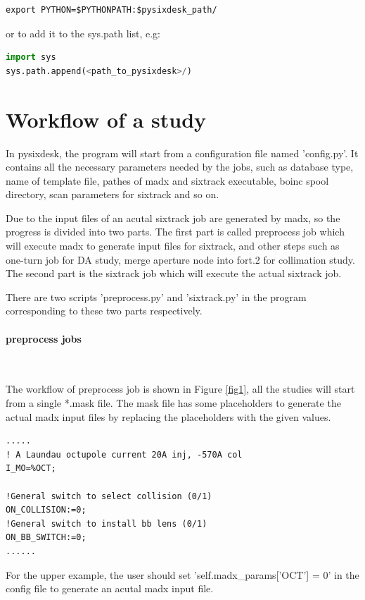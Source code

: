 \begin{lstlisting}
export PYTHON=$PYTHONPATH:$pysixdesk_path/
\end{lstlisting}

or to add it to the sys.path list, e.g:

\begin{lstlisting}[language=Python]
import sys
sys.path.append(<path_to_pysixdesk>/)
\end{lstlisting}

\section{Workflow of a study}

In pysixdesk, the program will start from a configuration file named 'config.py'. It contains all the necessary parameters needed by the jobs, such as database type, name of template file, pathes of madx and sixtrack executable, boinc spool directory, scan parameters for sixtrack and so on.

Due to the input files of an acutal sixtrack job are generated by madx, so the progress is divided into two parts. The first part is called preprocess job which will execute madx to generate input files for sixtrack, and other steps such as one-turn job for DA study, merge aperture node into fort.2 for collimation study. The second part is the sixtrack job which will execute the actual sixtrack job.

There are two scripts 'preprocess.py' and 'sixtrack.py' in the program corresponding to these two parts respectively.
\paragraph{preprocess jobs}~

The workflow of preprocess job is shown in Figure \ref{fig1}, all the studies will start from a single *.mask file. The mask file has some placeholders to generate the actual madx input files by replacing the placeholders with the given values.
\begin{lstlisting}
.....
! A Laundau octupole current 20A inj, -570A col
I_MO=%OCT;

!General switch to select collision (0/1)
ON_COLLISION:=0;
!General switch to install bb lens (0/1)
ON_BB_SWITCH:=0;
......
\end{lstlisting}

For the upper example, the user should set 'self.madx\_params['OCT'] = 0' in the config file to generate an acutal madx input file.

